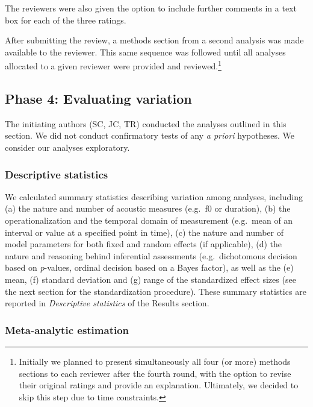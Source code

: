 \documentclass[Review,times,sageh]{sagej}
\begin{document}
\noindent The reviewers were also given the option to include further comments in a text box for each of the three ratings.

After submitting the review, a methods section from a second analysis was made available to the reviewer.
This same sequence was followed until all analyses allocated to a given reviewer were provided and reviewed.\footnote{Initially we planned to present simultaneously all four (or more) methods sections to each reviewer after the fourth round, with the option to revise their original ratings and provide an explanation. Ultimately, we decided to skip this step due to time constraints.}

\hypertarget{phase-4-evaluating-variation}{%
\subsection{Phase 4: Evaluating variation}\label{phase-4-evaluating-variation}}

The initiating authors (SC, JC, TR) conducted the analyses outlined in this section.
We did not conduct confirmatory tests of any \emph{a priori} hypotheses.
We consider our analyses exploratory.

\hypertarget{descriptive-statistics}{%
\subsubsection{Descriptive statistics}\label{descriptive-statistics}}

We calculated summary statistics describing variation among analyses, including (a) the nature and number of acoustic measures (e.g.~f0 or duration), (b) the operationalization and the temporal domain of measurement (e.g.~mean of an interval or value at a specified point in time), (c) the nature and number of model parameters for both fixed and random effects (if applicable), (d) the nature and reasoning behind inferential assessments (e.g.~dichotomous decision based on \emph{p}-values, ordinal decision based on a Bayes factor), as well as the (e) mean, (f) standard deviation and (g) range of the standardized effect sizes (see the next section for the standardization procedure).
These summary statistics are reported in \emph{Descriptive statistics} of the Results section.

\hypertarget{meta-analytic-estimation}{%
\subsubsection{Meta-analytic estimation}\label{meta-analytic-estimation}}
\end{document}

